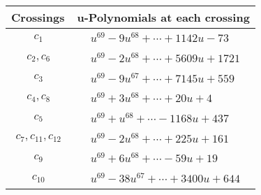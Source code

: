 \documentclass[1p]{elsarticle_modified}
\theoremstyle{definition}
\begin{document}
\begin{tabular}{m{50pt}|m{274pt}}
Crossings & \hspace{64pt}u-Polynomials at each crossing \\
\hline $$\begin{aligned}c_{1}\end{aligned}$$&$\begin{aligned}
&u^{69}-9 u^{68}+\cdots+1142 u-73
\end{aligned}$\\
\hline $$\begin{aligned}c_{2},c_{6}\end{aligned}$$&$\begin{aligned}
&u^{69}-2 u^{68}+\cdots+5609 u+1721
\end{aligned}$\\
\hline $$\begin{aligned}c_{3}\end{aligned}$$&$\begin{aligned}
&u^{69}-9 u^{67}+\cdots+7145 u+559
\end{aligned}$\\
\hline $$\begin{aligned}c_{4},c_{8}\end{aligned}$$&$\begin{aligned}
&u^{69}+3 u^{68}+\cdots+20 u+4
\end{aligned}$\\
\hline $$\begin{aligned}c_{5}\end{aligned}$$&$\begin{aligned}
&u^{69}+u^{68}+\cdots-1168 u+437
\end{aligned}$\\
\hline $$\begin{aligned}c_{7},c_{11},c_{12}\end{aligned}$$&$\begin{aligned}
&u^{69}-2 u^{68}+\cdots+225 u+161
\end{aligned}$\\
\hline $$\begin{aligned}c_{9}\end{aligned}$$&$\begin{aligned}
&u^{69}+6 u^{68}+\cdots-59 u+19
\end{aligned}$\\
\hline $$\begin{aligned}c_{10}\end{aligned}$$&$\begin{aligned}
&u^{69}-38 u^{67}+\cdots+3400 u+644
\end{aligned}$\\
\hline
\end{tabular}\\~\\
\end{document}
